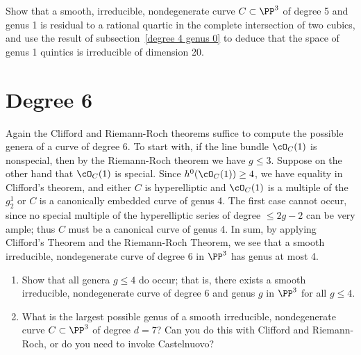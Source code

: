 
\begin{exercise}
Show that a smooth, irreducible, nondegenerate curve $C \subset \PP^3$ of degree 5 and genus 1 is residual to a rational quartic in the complete intersection of two cubics, and use the result of subsection~\ref{degree 4 genus 0} to deduce that the space of genus 1 quintics is irreducible of dimension 20.
\end{exercise}

\section{Degree 6}

Again the Clifford and Riemann-Roch theorems suffice to compute the possible genera of a curve of degree 6. To start with,  if the line bundle $\cO_C(1)$ is nonspecial, then by the Riemann-Roch theorem we have $g \leq 3$. Suppose on the other hand that $\cO_C(1)$ is special. Since   $h^{0}(\cO_C(1)) \geq 4$, we have equality in Clifford's theorem, and either $C$ is hyperelliptic and $\cO_C(1)$ is a multiple of the $g^{1}_{2}$ or  $C$ is  a canonically embedded curve of genus 4. The first case cannot occur, since no special multiple of the hyperelliptic series of degree $\leq 2g-2$ can be very ample; thus $C$ must be a canonical curve of genus 4. In sum, by applying Clifford's Theorem and the Riemann-Roch Theorem, we see that a smooth irreducible, nondegenerate curve of degree 6 in $\PP^3$ has genus at most 4.

\begin{exercise}
\begin{enumerate}
\item Show that all genera $g \leq 4$ do occur; that is, there exists a smooth irreducible, nondegenerate curve of degree 6 and genus $g$ in $\PP^3$ for all $g \leq 4$.
\item What is the largest possible genus of a smooth irreducible, nondegenerate curve $C \subset \PP^3$ of degree $d=7$? Can you do this with Clifford and Riemann-Roch, or do you need to invoke Castelnuovo?
\end{enumerate}
\end{exercise}


